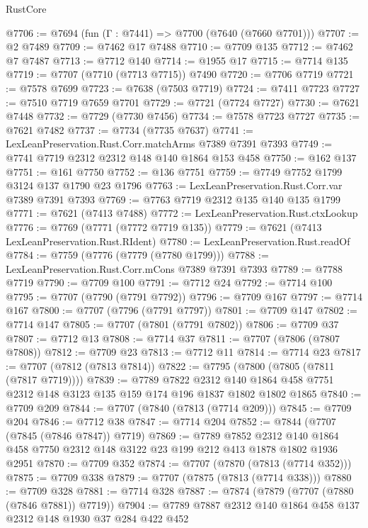 \begin{lexlean}{RustCore}
\begin{coremodule}
@7706 := @7694 (fun (Γ : @7441) => @7700 (@7640 (@7660 @7701)))
@7707 := @2 @7489
@7709 := @7462 @17 @7488
@7710 := @7709 @135
@7712 := @7462 @7 @7487
@7713 := @7712 @140
@7714 := @1955 @17
@7715 := @7714 @135
@7719 := @7707 (@7710 (@7713 @7715)) @7490
@7720 := @7706 @7719
@7721 := @7578 @7699
@7723 := @7638 (@7503 @7719)
@7724 := @7411 @7723
@7727 := @7510 @7719 @7659 @7701
@7729 := @7721 (@7724 @7727)
@7730 := @7621 @7448
@7732 := @7729 (@7730 @7456)
@7734 := @7578 @7723 @7727
@7735 := @7621 @7482
@7737 := @7734 (@7735 @7637)
@7741 := LexLeanPreservation.Rust.Corr.matchArms @7389 @7391 @7393
@7749 := @7741 @7719 @2312 @2312 @148 @140 @1864 @153 @458
@7750 := @162 @137
@7751 := @161 @7750
@7752 := @136 @7751
@7759 := @7749 @7752 @1799 @3124 @137 @1790 @23 @1796
@7763 := LexLeanPreservation.Rust.Corr.var @7389 @7391 @7393
@7769 := @7763 @7719 @2312 @135 @140 @135 @1799
@7771 := @7621 (@7413 @7488)
@7772 := LexLeanPreservation.Rust.ctxLookup
@7776 := @7769 (@7771 (@7772 @7719 @135))
@7779 := @7621 (@7413 LexLeanPreservation.Rust.RIdent)
@7780 := LexLeanPreservation.Rust.readOf
@7784 := @7759 (@7776 (@7779 (@7780 @1799)))
@7788 := LexLeanPreservation.Rust.Corr.mCons @7389 @7391 @7393
@7789 := @7788 @7719
@7790 := @7709 @100
@7791 := @7712 @24
@7792 := @7714 @100
@7795 := @7707 (@7790 (@7791 @7792))
@7796 := @7709 @167
@7797 := @7714 @167
@7800 := @7707 (@7796 (@7791 @7797))
@7801 := @7709 @147
@7802 := @7714 @147
@7805 := @7707 (@7801 (@7791 @7802))
@7806 := @7709 @37
@7807 := @7712 @13
@7808 := @7714 @37
@7811 := @7707 (@7806 (@7807 @7808))
@7812 := @7709 @23
@7813 := @7712 @11
@7814 := @7714 @23
@7817 := @7707 (@7812 (@7813 @7814))
@7822 := @7795 (@7800 (@7805 (@7811 (@7817 @7719))))
@7839 := @7789
    @7822
    @2312
    @140
    @1864
    @458
    @7751
    @2312
    @148
    @3123
    @135
    @159
    @174
    @196
    @1837
    @1802
    @1802
    @1865
@7840 := @7709 @209
@7844 := @7707 (@7840 (@7813 (@7714 @209)))
@7845 := @7709 @204
@7846 := @7712 @38
@7847 := @7714 @204
@7852 := @7844 (@7707 (@7845 (@7846 @7847)) @7719)
@7869 := @7789
    @7852
    @2312
    @140
    @1864
    @458
    @7750
    @2312
    @148
    @3122
    @23
    @199
    @212
    @413
    @1878
    @1802
    @1936
    @2951
@7870 := @7709 @352
@7874 := @7707 (@7870 (@7813 (@7714 @352)))
@7875 := @7709 @338
@7879 := @7707 (@7875 (@7813 (@7714 @338)))
@7880 := @7709 @328
@7881 := @7714 @328
@7887 := @7874 (@7879 (@7707 (@7880 (@7846 @7881)) @7719))
@7904 := @7789
    @7887
    @2312
    @140
    @1864
    @458
    @137
    @2312
    @148
    @1930
    @37
    @284
    @422
    @452

\end{coremodule}
\end{lexlean}

